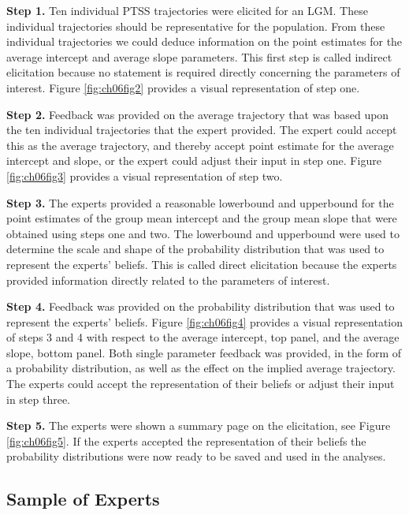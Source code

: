 \documentclass[openright,titlepage,12pt,a4paper]{book}
\begin{document}
\textbf{Step 1.} Ten individual PTSS trajectories were elicited for an LGM. These individual trajectories should be representative for the population. From these individual trajectories we could deduce information on the point estimates for the average intercept and average slope parameters. This first step is called indirect elicitation because no statement is required directly concerning the parameters of interest. Figure \ref{fig:ch06fig2} provides a visual representation of step one.

\textbf{Step 2.} Feedback was provided on the average trajectory that was based upon the ten individual trajectories that the expert provided. The expert could accept this as the average trajectory, and thereby accept point estimate for the average intercept and slope, or the expert could adjust their input in step one. Figure \ref{fig:ch06fig3} provides a visual representation of step two.

\textbf{Step 3.} The experts provided a reasonable lowerbound and upperbound for the point estimates of the group mean intercept and the group mean slope that were obtained using steps one and two. The lowerbound and upperbound were used to determine the scale and shape of the probability distribution that was used to represent the experts' beliefs. This is called direct elicitation because the experts provided information directly related to the parameters of interest.

\textbf{Step 4.} Feedback was provided on the probability distribution that was used to represent the experts' beliefs. Figure \ref{fig:ch06fig4} provides a visual representation of steps 3 and 4 with respect to the average intercept, top panel, and the average slope, bottom panel. Both single parameter feedback was provided, in the form of a probability distribution, as well as the effect on the implied average trajectory. The experts could accept the representation of their beliefs or adjust their input in step three.

\textbf{Step 5.} The experts were shown a summary page on the elicitation, see Figure \ref{fig:ch06fig5}. If the experts accepted the representation of their beliefs the probability distributions were now ready to be saved and used in the analyses.

\hypertarget{sample-of-experts}{%
\subsection{Sample of Experts}\label{sample-of-experts}}
\end{document}
